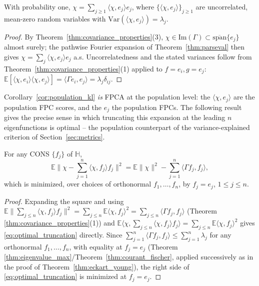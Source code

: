 \begin{corollary}
\label{cor:population_kl}
With probability one, $\chi = \sum_{j\geq 1}\langle\chi,e_j\rangle e_j$,
where $\{\langle\chi,e_j\rangle\}_{j\geq 1}$ are uncorrelated, mean-zero
random variables with $\mathrm{Var}(\langle\chi,e_j\rangle)=\lambda_j$.
\end{corollary}

\begin{proof}
By Theorem~\ref{thm:covariance_properties}(3), $\chi\in\mathrm{Im}
(\Gamma)\subset\overline{\mathrm{span}}\{e_j\}$ almost surely; the
pathwise Fourier expansion of Theorem~\ref{thm:parseval} then gives $\chi=
\sum_j\langle\chi,e_j\rangle e_j$ a.s. Uncorrelatedness and the stated
variances follow from Theorem~\ref{thm:covariance_properties}(1) applied
to $f=e_i,g=e_j$: $\mathbb{E}[\langle\chi,e_i\rangle\langle\chi,e_j
\rangle]=\langle\Gamma e_i,e_j\rangle=\lambda_j\delta_{ij}$.
\end{proof}

Corollary~\ref{cor:population_kl} \emph{is} FPCA at the population level:
the $\langle\chi,e_j\rangle$ are the population FPC scores, and the
$e_j$ the population FPCs. The following result gives the precise sense in
which truncating this expansion at the leading $n$ eigenfunctions is
optimal -- the population counterpart of the variance-explained criterion
of Section~\ref{sec:metrics}.

\begin{theorem}
\label{thm:optimal_truncation}
For any CONS $\{f_j\}$ of $\mathbb{H}$,
\begin{equation}
\mathbb{E}\Big\|\chi-\sum_{j=1}^n\langle\chi,f_j\rangle f_j\Big\|^2 =
\mathbb{E}\|\chi\|^2 - \sum_{j=1}^n\langle\Gamma f_j,f_j\rangle,
\label{eq:optimal_truncation}
\end{equation}
which is minimized, over choices of orthonormal $f_1,\dots,f_n$, by
$f_j=e_j$, $1\leq j\leq n$.
\end{theorem}

\begin{proof}
Expanding the square and using $\mathbb{E}\|\sum_{j\leq n}\langle\chi,f_j
\rangle f_j\|^2 = \sum_{j\leq n}\mathbb{E}\langle\chi,f_j\rangle^2 =
\sum_{j\leq n}\langle\Gamma f_j,f_j\rangle$ (Theorem
\ref{thm:covariance_properties}(1)) and $\mathbb{E}\langle\chi,\sum_{j\leq
n}\langle\chi,f_j\rangle f_j\rangle = \sum_{j\leq n}\mathbb{E}\langle\chi,
f_j\rangle^2$ gives \eqref{eq:optimal_truncation} directly. Since
$\sum_{j=1}^n\langle\Gamma f_j,f_j\rangle\leq\sum_{j=1}^n\lambda_j$ for any
orthonormal $f_1,\dots,f_n$, with equality at $f_j=e_j$ (Theorem
\ref{thm:eigenvalue_max}/Theorem~\ref{thm:courant_fischer}, applied
successively as in the proof of Theorem~\ref{thm:eckart_young}), the
right side of \eqref{eq:optimal_truncation} is minimized at $f_j=e_j$.
\end{proof}

